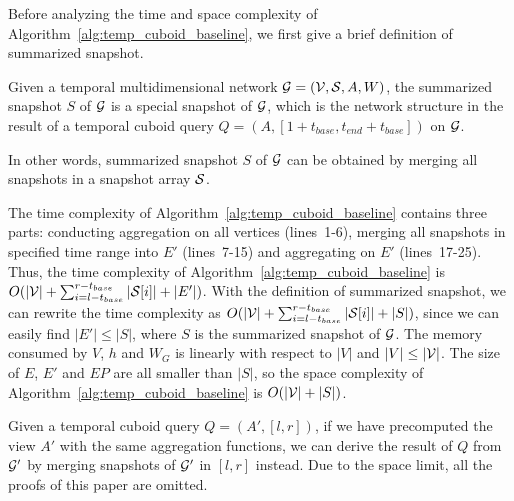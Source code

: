 \documentclass[10pt,journal,compsoc]{IEEEtran}
\begin{document}



Before analyzing the time and space complexity of Algorithm~\ref{alg:temp_cuboid_baseline}, we first give a brief definition of summarized snapshot.
\begin{definition}
	\label{def:sum_snap}
	Given a temporal multidimensional network $\mathcal{G}=(\mathcal{V},\mathcal{S},A,W)$, the summarized snapshot $ S $ of $ \mathcal{G} $ is a special snapshot of $ \mathcal{G} $, which is the network structure in the result of a temporal cuboid query $ Q=(A,[1+t_{base},t_{end}+t_{base}]) $ on $ \mathcal{G} $.
\end{definition}
In other words, summarized snapshot $ S $ of $ \mathcal{G} $ can be obtained by merging all snapshots in a snapshot array $ \mathcal{S} $.

The time complexity of Algorithm~\ref{alg:temp_cuboid_baseline} contains three parts: conducting aggregation on all vertices (lines~1-6), merging all snapshots in specified time range into $ E' $ (lines~7-15) and aggregating on $ E' $ (lines~17-25). Thus, the time complexity of Algorithm~\ref{alg:temp_cuboid_baseline} is $ O(|\mathcal{V}|+\sum_{i=l-t_{base}}^{r-t_{base}}|\mathcal{S}[i]|+|E'|) $. With the definition of summarized snapshot, we can rewrite the time complexity as $ O(|\mathcal{V}|+\sum_{i=l-t_{base}}^{r-t_{base}}|\mathcal{S}[i]|+|S|) $, since we can easily find $ |E'| \leq |S|$, where $ S $ is the summarized snapshot of $ \mathcal{G} $. The memory consumed by $V$, $h$ and $W_{G}$ is linearly with respect to $ |V| $ and $ |V| \leq |\mathcal{V}| $. The size of $ E $, $ E' $ and $ EP $ are all smaller than $ |S| $, so the space complexity of Algorithm~\ref{alg:temp_cuboid_baseline} is $ O(|\mathcal{V}|+|S|) $.

Given a temporal cuboid query $ Q=(A',[l,r]) $, if we have precomputed the view $ A' $ with the same aggregation functions, we can derive the result of $ Q $ from $ \mathcal{G}' $ by merging snapshots of $ \mathcal{G}' $ in $ [l,r] $ instead.  Due to the space limit, all the proofs of this paper are omitted.
\end{document}
